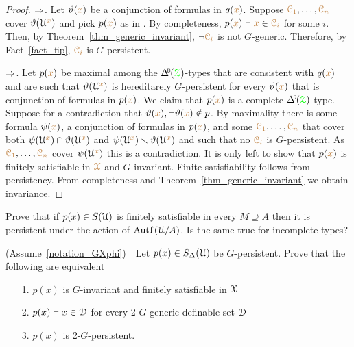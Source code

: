 \begin{proof}
  $\Rightarrow$.
  Let $\vartheta({\color{brown} x})$ be a conjunction of formulas in $q({\color{brown} x})$.
  Suppose ${\color{brown}\EuScript C_1},\dots,{\color{brown}\EuScript C_n}$ cover $\vartheta(\EuScript U^{\color{brown} x})$ and pick $p({\color{brown} x})$ as in .
  By completeness, $p({\color{brown} x})\vdash {\color{brown}x}\in{\color{brown}\EuScript C_i}$ for some $i$.
  Then, by Theorem~\ref{thm_generic_invariant}, $\neg{\color{brown}\EuScript C_i}$ is not $G$-generic.
  Therefore, by Fact~\ref{fact_fip}, ${\color{brown}\EuScript C_i}$ is $G$-persistent.

  $\Rightarrow$.
  Let $p({\color{brown} x})$ be maximal among the $\BDelta({\grZ})$-types that are consistent with $q({\color{brown} x})$ and are such that $\vartheta(\EuScript U^{\color{brown} x})$ is hereditarely $G$-persistent for every $\vartheta({\color{brown} x})$ that is conjunction of formulas in $p({\color{brown} x})$.
  We claim that $p({\color{brown} x})$ is a complete $\BDelta({\grZ})$-type.
  Suppose for a contradiction that $\vartheta({\color{brown} x}),\neg\vartheta({\color{brown} x})\notin p$.
  By maximality there is some formula $\psi({\color{brown} x})$, a conjunction of formulas in $p({\color{brown} x})$, and some ${\color{brown}\EuScript C_1},\dots,{\color{brown}\EuScript C_n}$ that cover both $\psi(\EuScript U^{\color{brown} x})\cap\vartheta(\EuScript U^{\color{brown} x})$ and $\psi(\EuScript U^{\color{brown} x})\smallsetminus\vartheta(\EuScript U^{\color{brown} x})$ and such that no ${\color{brown}\EuScript C_i}$ is $G$-persistent.
  As ${\color{brown}\EuScript C_1},\dots,{\color{brown}\EuScript C_n}$ cover $\psi(\EuScript U^{\color{brown} x})$ this is a contradiction.
  It is only left to show that $p({\color{brown} x})$ is finitely satisfiable in ${\color{brown}\EuScript X}$ and $G$-invariant.
  Finite satisfiability follows from persistency.
  From completeness and Theorem~\ref{thm_generic_invariant} we obtain invariance.
\end{proof}

\begin{exercise}
  Prove that if $p(x)\in S(\EuScript U)$ is finitely satisfiable in every $M\supseteq A$ then it is persistent under the action of $\mathord{\rm Aut\kern.15ex{f}\kern.15ex}(\EuScript U/A)$.
  Is the same true for incomplete types?
\end{exercise}

\begin{exercise}
  (Assume~\ref{notation_GXphi})\ \  
  Let $p(x)\in S_\Delta(\EuScript U)$ be $G$-persistent.
  Prove that the following are equivalent
  \begin{itemize}
    \item[1.] $p(x)$ is $G$-invariant and finitely satisfiable in $\EuScript X$
    \item[2.] $p(x)\vdash x\in\EuScript D$ for every 2-$G$-generic definable set $\EuScript D$
    \item[3.] $p(x)$ is 2-$G$-persistent.
  \end{itemize}
\end{exercise}

